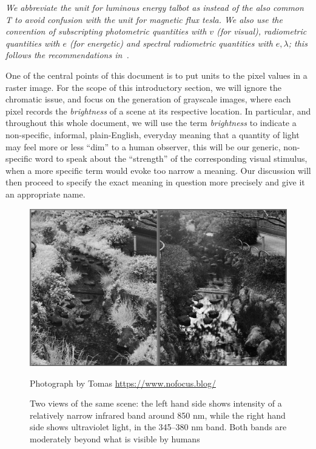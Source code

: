 \begin{table}
{}
\vskip 1mm
{\footnotesize\it We abbreviate the unit for luminous energy \textit{talbot} as
\unit{\talbot} instead of the also common \unit{\tesla} to avoid confusion with the
unit for magnetic flux \textit{tesla}.
We also use the convention of subscripting photometric quantities
with $v$ (for \textit{visual}), radiometric quantities with $e$ (for
\textit{energetic}) and spectral radiometric quantities with $e,\lambda$;
this follows the recommendations in~\cite{iso:80000-7:2019,cie:s017.2020,iec:60050-845:2020}.}
\end{table}


One of the central points of this document is to put units to the pixel values in a raster image. 
For the scope of this introductory section, we will ignore the chromatic issue, and focus on 
the generation of grayscale images, where each pixel records the \textsl{\gls{brightness}} of 
a scene at its respective location. 
In particular, and throughout this whole document, we will use the term \textsl{brightness} 
to indicate a non-specific, informal, plain-English, everyday meaning that a quantity of light may 
feel more or less ``dim'' to a human observer, this will be our generic, non-specific word to
speak about the ``strength'' of the corresponding visual stimulus, when a more specific term would evoke too
narrow a meaning. 
Our discussion will then proceed to specify the exact meaning in question more 
precisely and give it an appropriate name.

\begin{figure}
	{
		\hfill
		\includegraphics[width=.8\linewidth]{figures_built/Infrared-photo-vs-Ultraviolet-photo.jpg}
		\hfill
	}	

	\caption{\label{fig:uv_ir_photo}
		Two views of the same scene: the left hand side
		shows intensity of a relatively narrow infrared band around 850 \unit{\nano\meter},
		while the right hand side shows ultraviolet light, 
		in the 345--380 \unit{\nano\meter} band. 
		Both bands are moderately beyond what is visible by humans}
	{\scriptsize\hfill
		Photograph by Tomas \url{https://www.nofocus.blog/}
	}
\end{figure}

